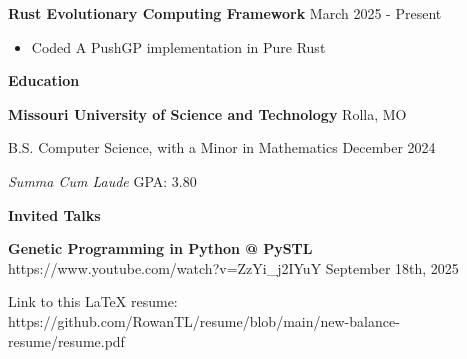\documentclass[11pt]{article}
\begin{document}
\textbf{Rust Evolutionary Computing Framework} \hfill March 2025 - Present
\begin{itemize}[noitemsep, topsep=0pt, partopsep=0pt, parsep=0pt, itemsep=0pt]
    \item Coded A PushGP implementation in Pure Rust
\end{itemize}

\begin{center}
    \textbf{Education}
\end{center}
\textbf{Missouri University of Science and Technology} \hfill Rolla, MO

B.S. Computer Science, with a Minor in Mathematics \hfill December 2024

\textit{Summa Cum Laude} \hfill GPA: 3.80

\begin{center}
    \textbf{Invited Talks}
\end{center}

\textbf{Genetic Programming in Python @ PySTL} \tiny{https://www.youtube.com/watch?v=ZzYi\_j2IYuY} \hfill \normalsize{September 18th, 2025}

\begin{center}
    \tiny{Link to this LaTeX resume: https://github.com/RowanTL/resume/blob/main/new-balance-resume/resume.pdf}
\end{center}
\end{document}

